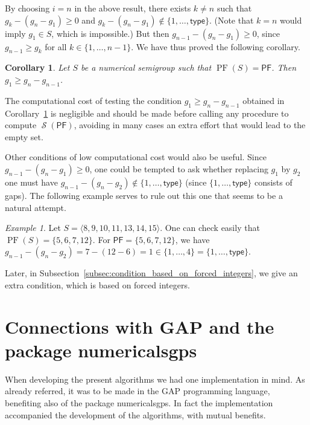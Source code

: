 \documentclass[11pt]{amsart}
\newtheorem{corollary}[theorem]{Corollary}
\theoremstyle{remark}
\newtheorem{example}[theorem]{Example}
\begin{document}
By choosing $i=n$ in the above result, there exists $k\ne n$ such that $g_k-(g_n-g_1)\ge 0$ and $g_k-(g_n-g_1)\not\in\{1,\ldots,{\ensuremath{\mathsf{type}}}\}$. (Note that $k=n$ would imply $g_1\in S$, which is impossible.) But then $g_{n-1}-(g_n-g_1)\ge 0$, since $g_{n-1}\ge g_k$ for all $k\in \{1,\ldots,n-1\}$. We have thus proved the following corollary.
\begin{corollary}\label{cor:naive_condition_g1}
Let $S$ be a numerical semigroup such that $\operatorname{PF}(S)={\ensuremath{\mathsf{PF}}}$. Then  $g_1\ge g_n-g_{n-1}$. 
\end{corollary}

The computational cost of testing the condition $g_1\ge g_n-g_{n-1}$ obtained in Corollary~\ref{cor:naive_condition_g1} is negligible and should be made before calling any procedure to compute $\operatorname{\mathcal{S}}({\ensuremath{\mathsf{PF}}})$, avoiding in many cases an extra effort that would lead to the empty set. 

Other conditions of low computational cost would also be useful. Since $g_{n-1}-(g_n-g_1)\ge 0$, one could be tempted to ask whether replacing $g_1$ by $g_2$ one must have $g_{n-1}-(g_n-g_2)\not\in\{1,\ldots,{\ensuremath{\mathsf{type}}}\}$ (since $\{1,\ldots,{\ensuremath{\mathsf{type}}}\}$ consists of gaps). The following example serves to rule out this one that seems to be a natural attempt.
\begin{example} Let $S=\langle 8, 9, 10, 11, 13, 14, 15\rangle$. One can check easily that $\operatorname{PF}(S)=\{5, 6, 7, 12\}$. For ${\ensuremath{\mathsf{PF}}} = \{5, 6, 7, 12\}$, we have $g_{n-1}-(g_n-g_2)=7-(12-6)=1\in \{1,\ldots,4\}=\{1,\ldots,{\ensuremath{\mathsf{type}}}\}$.
\end{example}
Later, in Subsection~\ref{subsec:condition_based_on_forced_integers}, we give an extra condition, which is based on forced integers. 

\section{Connections with \textsf{GAP} and the package \textsf{numericalsgps}}
\label{sec:connections_numericalsgps}
When developing the present algorithms we had one implementation in mind. As already referred, it was to be made in the \textsf{GAP} programming language, benefiting also of the package \textsf{numericalsgps}. In fact the implementation accompanied the development of the algorithms, with mutual benefits.
\end{document}
